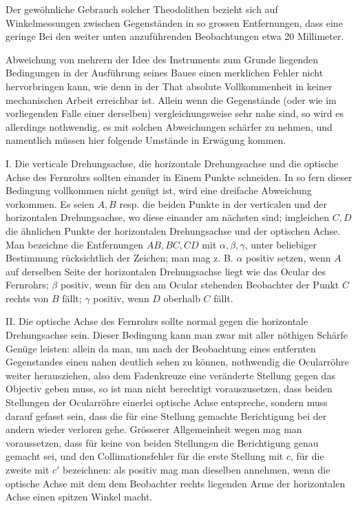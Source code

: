 Der gewöhnliche Gebrauch solcher Theodolithen bezieht sich auf Winkel\-messungen zwischen Gegenständen in so grossen Entfernungen, dass eine geringe
\expandafter\def\csname HistoricalNoteText443\endcsname{Bei den weiter unten anzuführenden Beobachtungen etwa 20 Millimeter.}%
\par\clearpage
{}
\noindent Abweichung von mehrern der Idee des Instruments zum Grunde liegenden Bedingungen in der Ausführung seines Baues einen merklichen Fehler nicht hervorbringen kann, wie denn in der That absolute Vollkommenheit in keiner mechanischen Arbeit erreichbar ist. Allein wenn die Gegenstände (oder wie im vorliegenden Falle einer derselben) vergleichungsweise sehr nahe sind, so wird es allerdings nothwendig, es mit solchen Abweichungen schärfer zu nehmen, und namentlich müssen hier folgende Umstände in Erwägung kommen.

I. Die verticale Drehungsachse, die horizontale Drehungsachse und die optische Achse des Fernrohrs sollten einander in Einem Punkte schneiden. In so fern dieser Bedingung vollkommen nicht genügt ist, wird eine dreifache Abweichung vorkommen. Es seien $A,B$ resp. die beiden Punkte in der verticalen und der horizontalen Drehungsachse, wo diese einander am nächsten sind; imgleichen $C,D$ die ähnlichen Punkte der horizontalen Drehungsachse und der optischen Achse. Man bezeichne die Entfernungen $AB,BC,CD$ mit $\alpha,\beta,\gamma$, unter beliebiger Bestimmung rücksichtlich der Zeichen; man mag z. B. $\alpha$ positiv setzen, wenn $A$ auf derselben Seite der horizontalen Drehungsachse liegt wie das Ocular des Fernrohrs; $\beta$ positiv, wenn für den am Ocular stehenden Beobachter der Punkt $C$ rechts von $B$ fällt; $\gamma$ positiv, wenn $D$ oberhalb $C$ fällt.

II. Die optische Achse des Fernrohrs sollte normal gegen die horizontale Drehungsachse sein. Dieser Bedingung kann man zwar mit aller nöthigen Schärfe Genüge leisten: allein da man, um nach der Beobachtung eines entfernten Gegenstandes einen nahen deutlich sehen zu können, nothwendig die Ocularröhre weiter herausziehen, also dem Fadenkreuze eine veränderte Stellung gegen das Objectiv geben muss, so ist man nicht berechtigt vorauszusetzen, dass beiden Stellungen der Ocularröhre einerlei optische Achse entspreche, sondern muss darauf gefasst sein, dass die für eine Stellung gemachte Berichtigung bei der andern wieder verloren gehe. Grösserer Allgemeinheit wegen mag man voraussetzen, dass für keine von beiden Stellungen die Berichtigung genau gemacht sei, und den Collimationsfehler für die erste Stellung mit $c$, für die zweite mit $c'$ bezeichnen: als positiv mag man dieselben annehmen, wenn die optische Achse mit dem dem Beobachter rechts liegenden Arme der horizontalen Achse einen spitzen Winkel macht.


